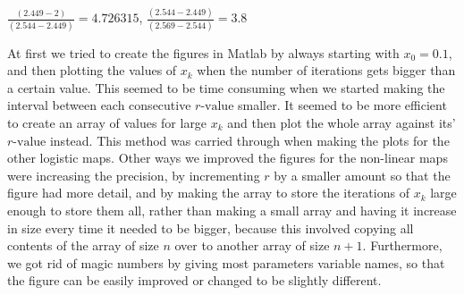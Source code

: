 \documentclass[a4wide, 10pt]{article}
\begin{document}
\begin{center} 	  
   	  $\frac{(2.449-2)}{(2.544-2.449)} = 4.726315$, $\frac{(2.544-2.449)}{(2.569-2.544)} = 3.8$ 
\end{center}
 
At first we tried to create the figures in Matlab by always starting with $x_{0} = 0.1$, and then plotting the values of $x_{k}$
  when the number of iterations gets bigger than a certain value. This seemed to be time 
   consuming when we started making the interval between each consecutive $r \textrm{-value}$ smaller. It seemed 
    to be more efficient to create an array of values for large $x_{k}$ and then plot the whole 
     array against its' $r \textrm{-value}$ instead. 
       This method was carried through when making the plots for the other logistic maps. Other ways we 
 improved the figures for the non-linear maps were increasing the precision, by incrementing $r$ by a
  smaller amount so that the figure had more detail, and by making the array to store the iterations of
   $x_{k}$ large enough to store them all, rather than making a small array and having it increase in
    size every time it needed to be bigger, because this involved copying all contents of the array of
     size $n$ over to another array of size $n + 1$. Furthermore, we got rid of magic numbers by giving
      most parameters variable names, so that the figure can be easily improved or changed to be
       slightly different.
       
       
\end{document}
